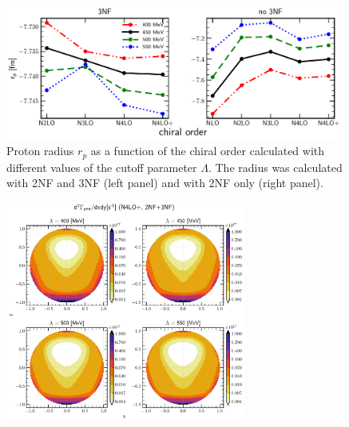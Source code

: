     \begin{figure}[h]
        \begin{center}
        \includegraphics[width=0.99\textwidth]{PlotData/PION/Dalitz_maps/figures/proton_radius_mt31_3NF.pdf}
        \end{center}
        \caption{ Proton radius $r_p$ as a function of the chiral order calculated with
        different values of the cutoff parameter $\Lambda$. The radius was calculated with 2NF and 3NF (left panel)
        and with 2NF only (right panel).}
        \label{proton_rad}
    \end{figure}

    \begin{figure}[h]
        \begin{center}
        \includegraphics[width=0.7\textwidth]{PlotData/PION/Dalitz_maps/figures/Dalitz_map_pnn_xy_cutofs.pdf}
        \end{center}
        \caption{}
        \label{pion_map_xy_cutoff}
    \end{figure}

